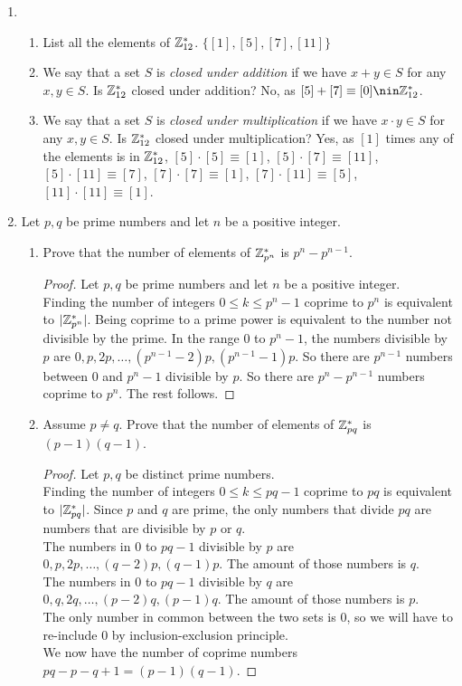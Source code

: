 \documentclass[12pt]{article}
\begin{document}
\begin{enumerate}
		\item \hphantom{word}
		\begin{enumerate}
			\item List all the elements of $\mathbb{Z}^*_{12}$.\m
			$\{[1],[5],[7],[11]\}$
			\item We say that a set $S$ is \textit{closed under addition} if we have $x+y\in S$ for any $x,y \in S$. Is $\mathbb{Z}^*_{12}$ closed under addition?\m
			No, as $[5]+[7] \equiv [0] \nin \Z^*_{12}$.
			\item We say that a set $S$ is \textit{closed under multiplication} if we have $x\cdot y\in S$ for any $x,y \in S$. Is $\mathbb{Z}^*_{12}$ closed under multiplication?\m
			Yes, as $[1]$ times any of the elements is in $\mathbb{Z}^*_{12}$, $[5]\cdot[5] \equiv [1]$, $[5]\cdot[7] \equiv [11]$, $[5]\cdot[11] \equiv [7]$, $[7]\cdot[7] \equiv [1]$, $[7]\cdot[11] \equiv [5]$, $[11]\cdot[11] \equiv [1]$.
		\end{enumerate}
		
		\item Let $p,q$ be prime numbers and let $n$ be a positive integer.
		\begin{enumerate}
			\item Prove that the number of elements of $\mathbb{Z}^*_{p^n}$ is $p^n-p^{n-1}$.
			\begin{proof}
				Let $p,q$ be prime numbers and let $n$ be a positive integer.\\
				Finding the number of integers $0 \leq k \leq p^n-1$ coprime to $p^n$ is equivalent to $|\mathbb{Z}^*_{p^n}|$. Being coprime to a prime power is equivalent to the number not divisible by the prime. In the range $0$ to $p^n-1$, the numbers divisible by $p$ are $0,p,2p,\ldots,(p^{n-1}-2)p,(p^{n-1}-1)p$. So there are $p^{n-1}$ numbers between $0$ and $p^n-1$ divisible by $p$. So there are $p^n-p^{n-1}$ numbers coprime to $p^n$. The rest follows.
			\end{proof}
			\item Assume $p\neq q$. Prove that the number of elements of $\mathbb{Z}^*_{pq}$ is $(p-1)(q-1)$.
			\begin{proof}
				Let $p,q$ be distinct prime numbers.\\
				Finding the number of integers $0 \leq k \leq pq-1$ coprime to $pq$ is equivalent to $|\mathbb{Z}^*_{pq}|$. Since $p$ and $q$ are prime, the only numbers that divide $pq$ are numbers that are divisible by $p$ or $q$.\\
				The numbers in $0$ to $pq-1$ divisible by $p$ are $0,p,2p,\ldots,(q-2)p,(q-1)p$. The amount of those numbers is $q$.\\
				The numbers in $0$ to $pq-1$ divisible by $q$ are $0,q,2q,\ldots,(p-2)q,(p-1)q$. The amount of those numbers is $p$.\\
				The only number in common between the two sets is $0$, so we will have to re-include $0$ by inclusion-exclusion principle.\\
				We now have the number of coprime numbers $pq-p-q+1 = (p-1)(q-1).$
			\end{proof}
		\end{enumerate}
	\end{enumerate}
\end{document}
